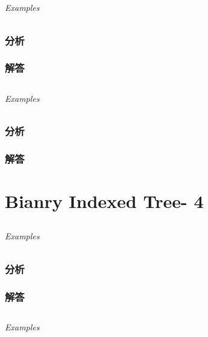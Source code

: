\documentclass[UTF8,a4paper,12pt]{ctexbook}
\begin{document}
\section{}
	
	\subparagraph{Examples}
	
	\subsection{分析}
	
	\subsection{解答}
	
\section{}
	
	\subparagraph{Examples}
	
	\subsection{分析}
	
	\subsection{解答}
	
\chapter{Bianry Indexed Tree- 4}
\section{}
	
	\subparagraph{Examples}
	
	\subsection{分析}
	
	\subsection{解答}
	
\section{}
	
	\subparagraph{Examples}
	
\end{document}
